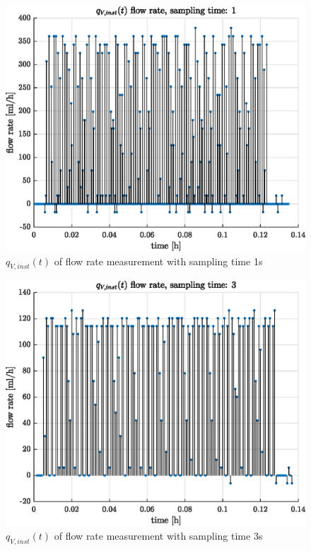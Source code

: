 \documentclass[12pt,a4paper]{article}
\begin{document}
	\newpage
	\begin{figure}[h!]
		\centering
		\includegraphics[width=0.8\linewidth]{figures/_q__V_inst__t___flow_rate__sampling_time__1.eps}
		\caption{$q_{V,inst}(t)$ of flow rate measurement with sampling time 1s}
		\label{fig:q_t_fr1}
	\end{figure}
	
	\begin{figure}[h!]
		\centering
		\includegraphics[width=0.8\linewidth]{figures/_q__V_inst__t___flow_rate__sampling_time__3.eps}
		\caption{$q_{V,inst}(t)$ of flow rate measurement with sampling time 3s}
		\label{fig:q_t_fr3}
	\end{figure}
	
\end{document}

